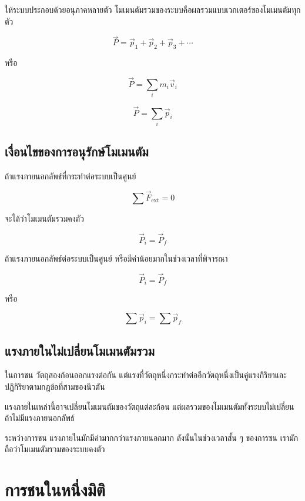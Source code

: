 ให้ระบบประกอบด้วยอนุภาคหลายตัว โมเมนตัมรวมของระบบคือผลรวมแบบเวกเตอร์ของโมเมนตัมทุกตัว

\[
\vec{P}=\vec{p}_1+\vec{p}_2+\vec{p}_3+\cdots
\]

หรือ

\[
\vec{P}=\sum_i m_i\vec{v}_i
\]

\begin{tcolorbox}[title=โมเมนตัมรวมของระบบ]
\[
\vec{P}=\sum_i \vec{p}_i
\]
\end{tcolorbox}

\subsection{เงื่อนไขของการอนุรักษ์โมเมนตัม}

ถ้าแรงภายนอกลัพธ์ที่กระทำต่อระบบเป็นศูนย์

\[
\sum \vec{F}_{\text{ext}}=0
\]

จะได้ว่าโมเมนตัมรวมคงตัว

\[
\vec{P}_i=\vec{P}_f
\]

\begin{tcolorbox}[title=กฎอนุรักษ์โมเมนตัม]
ถ้าแรงภายนอกลัพธ์ต่อระบบเป็นศูนย์ หรือมีค่าน้อยมากในช่วงเวลาที่พิจารณา

\[
\vec{P}_i=\vec{P}_f
\]

หรือ

\[
\sum \vec{p}_i=\sum \vec{p}_f
\]
\end{tcolorbox}

\subsection{แรงภายในไม่เปลี่ยนโมเมนตัมรวม}

ในการชน วัตถุสองก้อนออกแรงต่อกัน แต่แรงที่วัตถุหนึ่งกระทำต่ออีกวัตถุหนึ่งเป็นคู่แรงกิริยาและปฏิกิริยาตามกฎข้อที่สามของนิวตัน

แรงภายในเหล่านี้อาจเปลี่ยนโมเมนตัมของวัตถุแต่ละก้อน แต่ผลรวมของโมเมนตัมทั้งระบบไม่เปลี่ยน ถ้าไม่มีแรงภายนอกลัพธ์

\begin{tcolorbox}[title=ข้อควรจำสำหรับโจทย์ชน]
ระหว่างการชน แรงภายในมักมีค่ามากกว่าแรงภายนอกมาก ดังนั้นในช่วงเวลาสั้น ๆ ของการชน เรามักถือว่าโมเมนตัมรวมของระบบคงตัว
\end{tcolorbox}

\section{การชนในหนึ่งมิติ}

